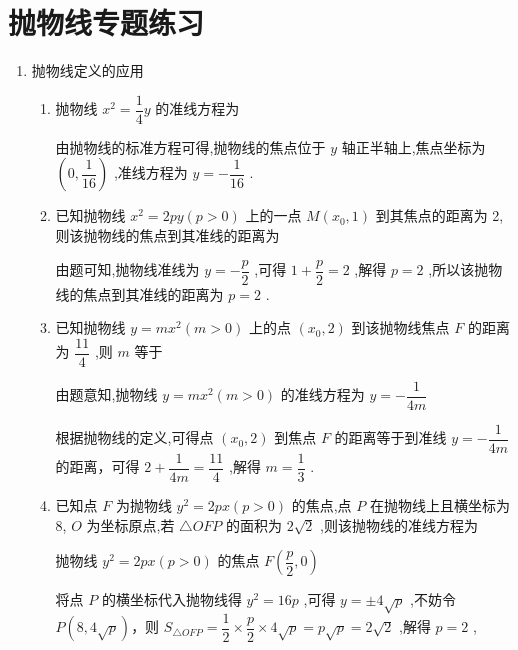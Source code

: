 \chapter*{抛物线专题练习}
\begin{enumerate}
    \item 抛物线定义的应用
    \begin{enumerate}
        \item 抛物线 ${x}^{2} = \dfrac{1}{4}y$ 的准线方程为
        \begin{jieda}
            由抛物线的标准方程可得,抛物线的焦点位于 $y$ 轴正半轴上,焦点坐标为 $\left( {0,\dfrac{1}{16}}\right)$ ,准线方程为 $y =  - \dfrac{1}{16}$ .
        \end{jieda}
        \item 已知抛物线 ${x}^{2} = {2py}\left( {p > 0}\right)$ 上的一点 $M\left( {{x}_{0},1}\right)$ 到其焦点的距离为 2,则该抛物线的焦点到其准线的距离为
        \begin{jieda}
            由题可知,抛物线准线为 $y =  - \dfrac{p}{2}$ ,可得 $1 + \dfrac{p}{2} = 2$ ,解得 $p = 2$ ,所以该抛物线的焦点到其准线的距离为 $p = 2$ .
        \end{jieda}
        \item 已知抛物线 $y = m{x}^{2}\left( {m > 0}\right)$ 上的点 $\left( {{x}_{0},2}\right)$ 到该抛物线焦点 $F$ 的距离为 $\dfrac{11}{4}$ ,则 $m$ 等于
        \begin{jieda}
            由题意知,抛物线 $y = m{x}^{2}\left( {m > 0}\right)$ 的准线方程为 $y =  - \dfrac{1}{4m}$
            
            根据抛物线的定义,可得点 $\left( {{x}_{0},2}\right)$ 到焦点 $F$ 的距离等于到准线 $y =  - \dfrac{1}{4m}$ 的距离，可得 $2 + \dfrac{1}{4m} = \dfrac{11}{4}$ ,解得 $m = \dfrac{1}{3}$ .
        \end{jieda}
        \item 已知点 $F$ 为抛物线 ${y}^{2} = {2px}\left( {p > 0}\right)$ 的焦点,点 $P$ 在抛物线上且横坐标为8, $O$ 为坐标原点,若 $\bigtriangleup {OFP}$ 的面积为 $2\sqrt{2}$ ,则该抛物线的准线方程为
        \begin{jieda}
            抛物线 ${y}^{2} = {2px}\left( {p > 0}\right)$ 的焦点 $F\left( {\dfrac{p}{2},0}\right)$
            
            将点 $P$ 的横坐标代入抛物线得 ${y}^{2} = {16p}$ ,可得 $y =  \pm  4\sqrt{p}$ ,不妨令 $P\left( {8,4\sqrt{p}}\right)$，则 ${S}_{\bigtriangleup {OFP}} = \dfrac{1}{2} \times  \dfrac{p}{2} \times  4\sqrt{p} = p\sqrt{p} = 2\sqrt{2}$ ,解得 $p = 2$ ,
            

\end{jieda}
\end{enumerate}
\end{enumerate}
